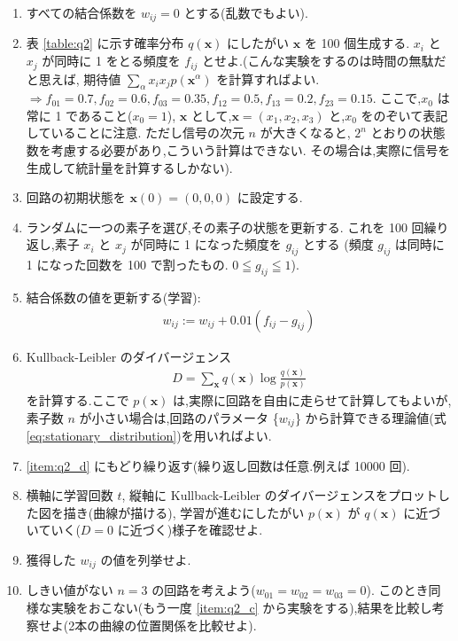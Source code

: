 \documentclass[a4j, uplatex, fleqn, dvipdfmx]{jsarticle} %
\begin{document}
\begin{enumerate}[label=(\alph{enumi}), ref=(\alph{enumi})]
  \item 
    すべての結合係数を $w_{ij} = 0$ とする(乱数でもよい).
  \item 
    表 \ref{table:q2} に示す確率分布 $q(\bm{x})$ にしたがい $\bm{x}$ を 100 個生成する.
    $x_i$ と $x_j$ が同時に 1 をとる頻度を $f_{ij}$ とせよ.(こんな実験をするのは時間の無駄だと思えば,
    期待値 $\sum_{\alpha} x_{i} x_{j} p\left(\bm{x}^{\alpha}\right)$ を計算すればよい.
    $\Rightarrow f_{01} = 0.7, f_{02} = 0.6, f_{03} = 0.35, f_{12} = 0.5, f_{13} = 0.2, f_{23} = 0.15.$
    ここで,$x_0$ は常に 1 であること($x_0 = 1$),
    $\bm{x}$ として,$\bm{x} = (x_1, x_2, x_3)$ と,$x_0$ をのぞいて表記していることに注意.
    ただし信号の次元 $n$ が大きくなると, $2^n$ とおりの状態数を考慮する必要があり,こういう計算はできない.
    その場合は,実際に信号を生成して統計量を計算するしかない).
  \item \label{item:q2_c}
    回路の初期状態を $\bm{x}(0) = (0, 0, 0)$ に設定する.
  \item \label{item:q2_d} 
    ランダムに一つの素子を選び,その素子の状態を更新する.
    これを 100 回繰り返し,素子 $x_i$ と $x_j$ が同時に 1 になった頻度を $g_{ij}$ とする
    (頻度 $g_{ij}$ は同時に 1 になった回数を 100 で割ったもの. $0 \leqq g_{ij} \leqq 1$).
  \item
    結合係数の値を更新する(学習):
    \begin{align}
      w_{i j}:=w_{i j}+0.01\left(f_{i j}-g_{i j}\right)
    \end{align}
  \item 
    Kullback-Leibler のダイバージェンス
    \begin{align}
      D=\sum_{\bm{x}} q(\bm{x}) \log \frac{q(\bm{x})}{p(\bm{x})}
    \end{align}
    を計算する.ここで $p(\bm{x})$ は,実際に回路を自由に走らせて計算してもよいが,
    素子数 $n$ が小さい場合は,回路のパラメータ \{$w_{ij}$\} から計算できる理論値(式\eqref{eq:stationary_distribution})を用いればよい.
  \item 
    \ref{item:q2_d} にもどり繰り返す(繰り返し回数は任意.例えば 10000 回).
  \item \label{item:q2_h}
    横軸に学習回数 $t$, 縦軸に Kullback-Leibler のダイバージェンスをプロットした図を描き(曲線が描ける),
    学習が進むにしたがい $p(\bm{x})$ が $q(\bm{x})$ に近づいていく($D = 0$ に近づく)様子を確認せよ.
  \item \label{item:q2_i}
    獲得した $w_{ij}$ の値を列挙せよ.
  \item \label{item:q2_j}
    しきい値がない $n = 3$ の回路を考えよう($w_{01} = w_{02} = w_{03} = 0$).
    このとき同様な実験をおこない(もう一度 \ref{item:q2_c} から実験をする),結果を比較し考察せよ(2本の曲線の位置関係を比較せよ).
\end{enumerate}
\end{document}
